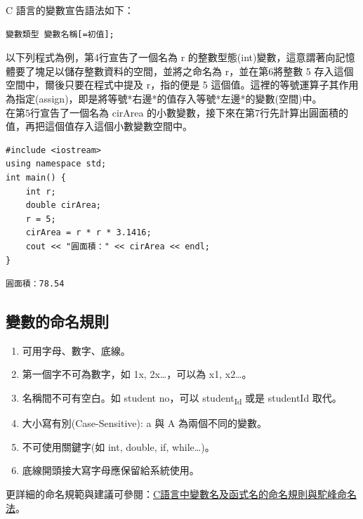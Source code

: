 \documentclass[a4paper,12pt]{article}
\begin{document}
C 語言的變數宣告語法如下：\\
\lstset{breaklines=true,language=:eval,label= ,caption= ,captionpos=b,numbers=none}
\begin{lstlisting}
變數類型 變數名稱[=初值];
\end{lstlisting}
以下列程式為例，第4行宣告了一個名為 r 的整數型態(int)變數，這意謂著向記憶體要了塊足以儲存整數資料的空間，並將之命名為 r，並在第6將整數 5 存入這個空間中，爾後只要在程式中提及 r，指的便是 5 這個值。這裡的等號運算子其作用為指定(assign)，即是將等號*右邊*的值存入等號*左邊*的變數(空間)中。\\

在第5行宣告了一個名為 cirArea 的小數變數，接下來在第7行先計算出圓面積的值，再把這個值存入這個小數變數空間中。\\
\lstset{breaklines=true,language=C++,label= ,caption= ,captionpos=b,firstnumber=1,numbers=left}
\begin{lstlisting}
#include <iostream>
using namespace std;
int main() {
    int r;
    double cirArea;
    r = 5;
    cirArea = r * r * 3.1416;
    cout << "圓面積：" << cirArea << endl;
}
\end{lstlisting}

\begin{verbatim}
圓面積：78.54
\end{verbatim}

\subsection{變數的命名規則}
\label{sec:org2e13425}
\begin{enumerate}
\item 可用字母、數字、底線。\\
\item 第一個字不可為數字，如 1x, 2x\ldots{}，可以為 x1, x2\ldots{}。\\
\item 名稱間不可有空白。如 student no，可以 student\textsubscript{Id} 或是 studentId 取代。\\
\item 大小寫有別(Case-Sensitive): a 與 A 為兩個不同的變數。\\
\item 不可使用關鍵字(如 int, double, if, while\ldots{})。\\
\item 底線開頭接大寫字母應保留給系統使用。\\
\end{enumerate}
更詳細的命名規範與建議可參閱：\href{https://www.itread01.com/content/1541214186.html}{C語言中變數名及函式名的命名規則與駝峰命名法}。\\
\end{document}
